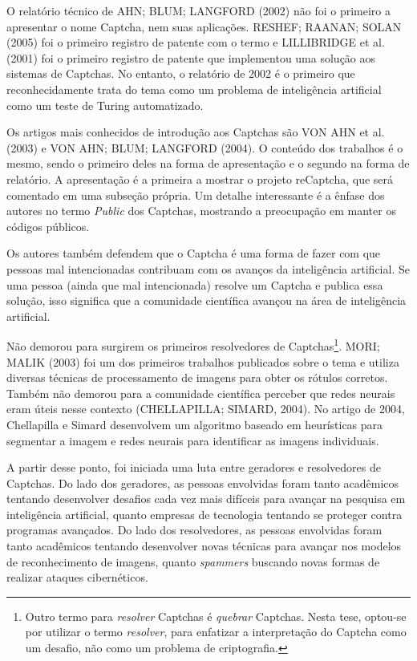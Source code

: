 \documentclass[12pt,twoside,brazilian]{book}
\begin{document}
O relatório técnico de AHN; BLUM; LANGFORD (2002) não foi o primeiro a
apresentar o nome Captcha, nem suas aplicações. RESHEF; RAANAN; SOLAN
(2005) foi o primeiro registro de patente com o termo e LILLIBRIDGE et
al. (2001) foi o primeiro registro de patente que implementou uma
solução aos sistemas de Captchas. No entanto, o relatório de 2002 é o
primeiro que reconhecidamente trata do tema como um problema de
inteligência artificial como um teste de Turing automatizado.

Os artigos mais conhecidos de introdução aos Captchas são VON AHN et al.
(2003) e VON AHN; BLUM; LANGFORD (2004). O conteúdo dos trabalhos é o
mesmo, sendo o primeiro deles na forma de apresentação e o segundo na
forma de relatório. A apresentação é a primeira a mostrar o projeto
reCaptcha, que será comentado em uma subseção própria. Um detalhe
interessante é a ênfase dos autores no termo \emph{Public} dos Captchas,
mostrando a preocupação em manter os códigos públicos.

Os autores também defendem que o Captcha é uma forma de fazer com que
pessoas mal intencionadas contribuam com os avanços da inteligência
artificial. Se uma pessoa (ainda que mal intencionada) resolve um
Captcha e publica essa solução, isso significa que a comunidade
científica avançou na área de inteligência artificial.

Não demorou para surgirem os primeiros resolvedores de
Captchas\footnote{Outro termo para \emph{resolver} Captchas é
  \emph{quebrar} Captchas. Nesta tese, optou-se por utilizar o termo
  \emph{resolver}, para enfatizar a interpretação do Captcha como um
  desafio, não como um problema de criptografia.}. MORI; MALIK (2003)
foi um dos primeiros trabalhos publicados sobre o tema e utiliza
diversas técnicas de processamento de imagens para obter os rótulos
corretos. Também não demorou para a comunidade científica perceber que
redes neurais eram úteis nesse contexto (CHELLAPILLA; SIMARD, 2004). No
artigo de 2004, Chellapilla e Simard desenvolvem um algoritmo baseado em
heurísticas para segmentar a imagem e redes neurais para identificar as
imagens individuais.

A partir desse ponto, foi iniciada uma luta entre geradores e
resolvedores de Captchas. Do lado dos geradores, as pessoas envolvidas
foram tanto acadêmicos tentando desenvolver desafios cada vez mais
difíceis para avançar na pesquisa em inteligência artificial, quanto
empresas de tecnologia tentando se proteger contra programas avançados.
Do lado dos resolvedores, as pessoas envolvidas foram tanto acadêmicos
tentando desenvolver novas técnicas para avançar nos modelos de
reconhecimento de imagens, quanto \emph{spammers} buscando novas formas
de realizar ataques cibernéticos.
\end{document}

